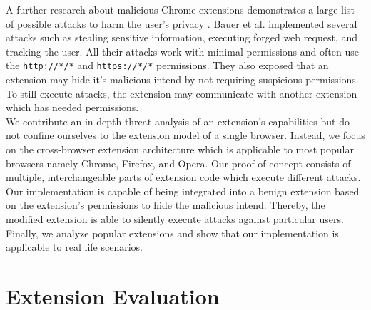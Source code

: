 	A further research about malicious Chrome extensions demonstrates a large list of possible attacks to harm the user's privacy \cite{extensions:cns14}. Bauer et al. implemented several attacks such as stealing sensitive information, executing forged web request, and tracking the user. All their attacks work with minimal permissions and often use the \texttt{http://*/*} and \texttt{https://*/*} permissions. They also exposed that an extension may hide it's malicious intend by not requiring suspicious permissions. To still execute attacks, the extension may communicate with another extension which has needed permissions. \\
	
	We contribute an in-depth threat analysis of an extension's capabilities but do not confine ourselves to the extension model of a single browser. Instead, we focus on the cross-browser extension architecture which is applicable to most popular browsers namely Chrome, Firefox, and Opera. Our proof-of-concept consists of multiple, interchangeable parts of extension code which execute different attacks. Our implementation is capable of being integrated into a benign extension based on the extension's permissions to hide the malicious intend. Thereby, the modified extension is able to silently execute attacks against particular users. Finally, we analyze popular extensions and show that our implementation is applicable to real life scenarios.
	
\section{Extension Evaluation} 
	
